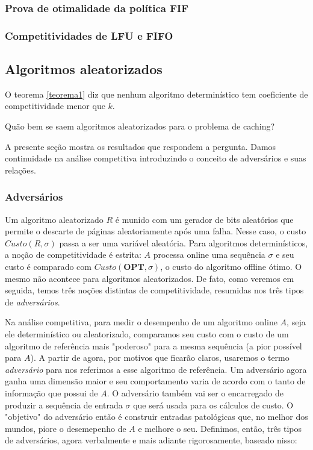 \documentclass[a4paper,oneside,reqno,12pt]{amsart}
\begin{document}
\subsubsection{Prova de otimalidade da política \textbf{FIF}}

\subsubsection{Competitividades de \textbf{LFU} e \textbf{FIFO}}

\subsection{Algoritmos aleatorizados}

O teorema \ref{teorema1} diz que nenhum algoritmo determinístico tem coeficiente de competitividade menor que \(k\). 

\begin{question}
Quão bem se saem algoritmos aleatorizados para o problema de caching?
\end{question}

A presente seção mostra os resultados que respondem a pergunta. Damos continuidade na análise competitiva introduzindo o conceito de adversários e suas relações.

\subsubsection{Adversários}

Um algoritmo aleatorizado \(R\) é munido com um gerador de bits aleatórios que permite o descarte de páginas aleatoriamente após uma falha. Nesse caso, o custo \(Custo(R,\sigma)\) passa a ser uma variável aleatória. Para algoritmos determinísticos, a noção de competitividade é estrita: \(A\) processa online uma sequência \(\sigma\) e seu custo é comparado com \(Custo(\textbf{OPT}, \sigma)\), o custo do algoritmo offline ótimo. O mesmo não acontece para algoritmos aleatorizados. De fato, como veremos em seguida, temos três noções distintas de competitividade, resumidas nos três tipos de \textit{adversários}. 

Na análise competitiva, para medir o desempenho de um algoritmo online \(A\), seja ele determinístico ou aleatorizado, comparamos seu custo com o custo de um algoritmo de referência mais "poderoso" para a mesma sequência (a pior possível para \(A\)). 
A partir de agora, por motivos que ficarão claros, usaremos o termo \textit{adversário} para nos referimos a esse algoritmo de referência. Um adversário agora ganha uma dimensão maior e seu comportamento varia de acordo com o tanto de informação que possui de \(A\). O adversário também vai ser o encarregado de produzir a sequência de entrada \(\sigma\) que será usada para os cálculos de custo. O "objetivo" do adversário então é construir entradas patológicas que, no melhor dos mundos, piore o desemepenho de \(A\) e melhore o seu. Definimos, então, três tipos de adversários, agora verbalmente e mais adiante rigorosamente, baseado nisso:
\end{document}
